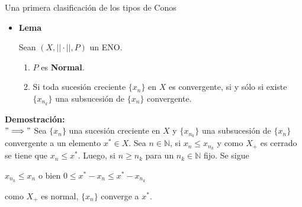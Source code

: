 


	\begin{frame}{Una primera clasificación de los tipos de Conos}
		
		\begin{itemize}
			\item  \textbf{Lema} 
			\begin{block}{}
				Sean $(X,|| \cdot || , P ) $ un ENO.  
				\begin{enumerate}
					\item[(i)] $P$ es   \textbf{Normal}. 
				\item[(ii)] Si  toda sucesión creciente $\{ x_{n} \}$ en $X$ es convergente, si y sólo si existe $ \{  x_{n_{k}} \} $ una subsucesión de $\{ x_{n} \}$ convergente. 
				\end{enumerate}
    \end{block}
		\end{itemize}
	\end{frame}




\begin{frame}{}
    \textbf{Demostración:}\\
    $ " \Longrightarrow  " $ Sea $\{ x_{n} \}$ una  sucesión creciente  en $X$ y $ \{  x_{n_{k}} \} $ una subsucesión de $\{ x_{n} \}$ convergente a un elemento $x^{*} \in X  $. Sea $ n \in \mathbb{N} $, si  $ x_{n} \leq x_{n_{k}} $ y como  $X_{+}$ es cerrado se tiene que $ x_{n} \leq x^{*} $. Luego,   si $  n \geq n_{k} $ para un $ n_{k} \in \mathbb{N} $ fijo. Se sigue 
    
    $ x_{n_{k}}  \leq  x_{n}  $ o bien  $  0 \leq x^{*} - x_{n} \leq x^{*} - x_{n_{k}} $


como  $X_{+}$ es normal, $ \{  x_{n}  \}  $ converge a $ x^{*} $. 
   
\end{frame}


